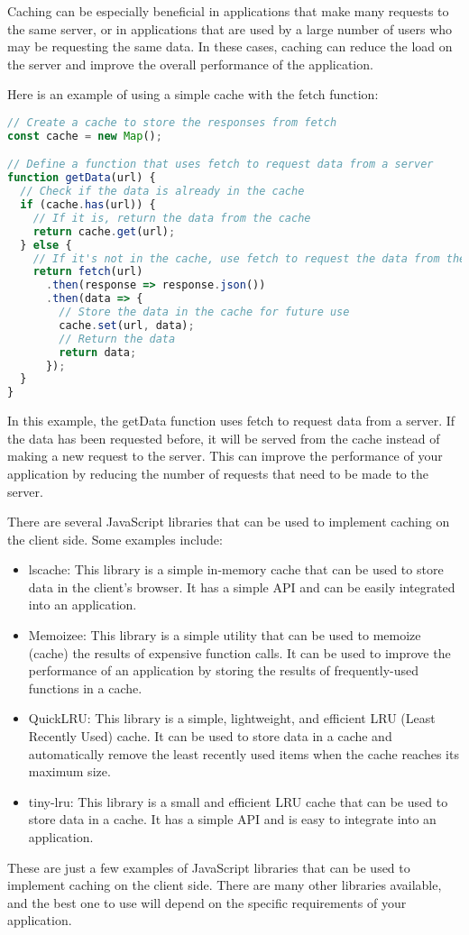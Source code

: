 {Caching can be especially beneficial in applications that make many requests to the same server, or in applications that are used by a large number of users who may be requesting the same data. In these cases, caching can reduce the load on the server and improve the overall performance of the application.


Here is an example of using a simple cache with the fetch function:
\begin{lstlisting}[language=Javascript]
// Create a cache to store the responses from fetch
const cache = new Map();

// Define a function that uses fetch to request data from a server
function getData(url) {
  // Check if the data is already in the cache
  if (cache.has(url)) {
    // If it is, return the data from the cache
    return cache.get(url);
  } else {
    // If it's not in the cache, use fetch to request the data from the server
    return fetch(url)
      .then(response => response.json())
      .then(data => {
        // Store the data in the cache for future use
        cache.set(url, data);
        // Return the data
        return data;
      });
  }
}
\end{lstlisting}

In this example, the getData function uses fetch to request data from a server. If the data has been requested before, it will be served from the cache instead of making a new request to the server. This can improve the performance of your application by reducing the number of requests that need to be made to the server.


There are several JavaScript libraries that can be used to implement caching on the client side. Some examples include:
\begin{itemize}
\item lscache: This library is a simple in-memory cache that can be used to store data in the client's browser. It has a simple API and can be easily integrated into an application.
\item Memoizee: This library is a simple utility that can be used to memoize (cache) the results of expensive function calls. It can be used to improve the performance of an application by storing the results of frequently-used functions in a cache.
\item QuickLRU: This library is a simple, lightweight, and efficient LRU (Least Recently Used) cache. It can be used to store data in a cache and automatically remove the least recently used items when the cache reaches its maximum size.
\item tiny-lru: This library is a small and efficient LRU cache that can be used to store data in a cache. It has a simple API and is easy to integrate into an application.
\end{itemize}
These are just a few examples of JavaScript libraries that can be used to implement caching on the client side. There are many other libraries available, and the best one to use will depend on the specific requirements of your application.

}
